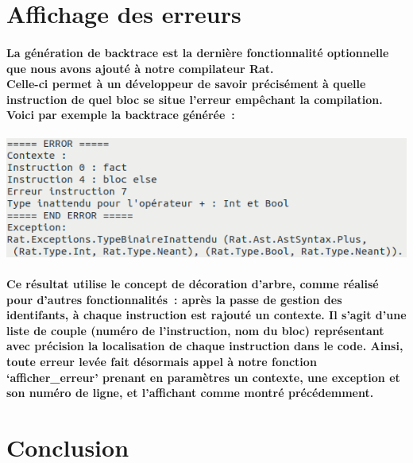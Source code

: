 \documentclass[french]{article}
\begin{document}
\section{Affichage des erreurs}
\paragraph*{La génération de backtrace est la dernière fonctionnalité optionnelle que nous avons ajouté à notre compilateur Rat. \\
Celle-ci permet à un développeur de savoir précisément à quelle instruction de quel bloc se situe l'erreur empêchant la compilation. 
Voici par exemple la backtrace générée~:}

\begin{center}
        
\end{center}
\includegraphics[width=\textwidth]{backtrace.png}

\paragraph*{Ce résultat utilise le concept de décoration d'arbre, comme réalisé pour d'autres fonctionnalités~: après la passe de gestion des identifants,
à chaque instruction est rajouté un contexte. Il s'agit d'une liste de couple (numéro de l'instruction, nom du bloc) représentant avec précision la localisation
de chaque instruction dans le code. Ainsi, toute erreur levée fait désormais appel à notre fonction `afficher\_erreur' prenant en paramètres
un contexte, une exception et son numéro de ligne, et l'affichant comme montré précédemment.}

\section{Conclusion}
\end{document}
